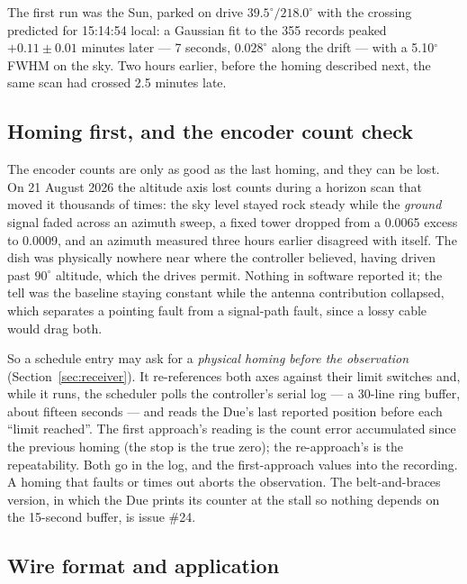 \documentclass[11pt,a4paper]{article}
\begin{document}
The first run was the Sun, parked on drive $39.5^\circ/218.0^\circ$ with the crossing predicted for 15:14:54 local: a Gaussian fit to the 355 records peaked $+0.11 \pm 0.01$ minutes later --- 7 seconds, $0.028^\circ$ along the drift --- with a 5.10$^\circ$ FWHM on the sky. Two hours earlier, before the homing described next, the same scan had crossed 2.5 minutes late.

\subsection{Homing first, and the encoder count check}
\label{sec:homefirst}

The encoder counts are only as good as the last homing, and they can be lost. On 21 August 2026 the altitude axis lost counts during a horizon scan that moved it thousands of times: the sky level stayed rock steady while the \emph{ground} signal faded across an azimuth sweep, a fixed tower dropped from a 0.0065 excess to 0.0009, and an azimuth measured three hours earlier disagreed with itself. The dish was physically nowhere near where the controller believed, having driven past $90^\circ$ altitude, which the drives permit. Nothing in software reported it; the tell was the baseline staying constant while the antenna contribution collapsed, which separates a pointing fault from a signal-path fault, since a lossy cable would drag both.

So a schedule entry may ask for a \emph{physical homing before the observation} (Section~\ref{sec:receiver}). It re-references both axes against their limit switches and, while it runs, the scheduler polls the controller's serial log --- a 30-line ring buffer, about fifteen seconds --- and reads the Due's last reported position before each ``limit reached''. The first approach's reading is the count error accumulated since the previous homing (the stop is the true zero); the re-approach's is the repeatability. Both go in the log, and the first-approach values into the recording. A homing that faults or times out aborts the observation. The belt-and-braces version, in which the Due prints its counter at the stall so nothing depends on the 15-second buffer, is issue \#24.

\subsection{Wire format and application}
\end{document}
